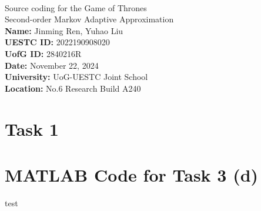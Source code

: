 \documentclass[a4paper,12pt]{article}
\begin{document}
\begin{center}
    \textbf{ } \\
    \vspace{4em}
    {\huge \textsf{Source coding for the Game of Thrones}} \\
    \vspace{1.5em}
    {\large \textsf{Second-order Markov Adaptive Approximation}} \\
    \vspace{1em}
    \vspace{1.5cm}
    \textbf{Name:} Jinming Ren, Yuhao Liu \\
    \vspace{0.5em}
    \textbf{UESTC ID:} 2022190908020 \\
    \vspace{0.5em}
    \textbf{UofG ID:} 2840216R \\
    \vspace{0.5em}
    \textbf{Date:} November 22, 2024 \\
    \vspace{0.5em}
    \vspace{0.5cm}
    \textbf{University:} UoG-UESTC Joint School \\
    \vspace{0.5em}
    \textbf{Location:} No.6 Research Build A240 \\
    \vspace{2cm}
\end{center}


\tableofcontents

\newpage



\section{Task 1}



\newpage
\appendix

\section{MATLAB Code for Task 3 (d)}
test
\end{document}
